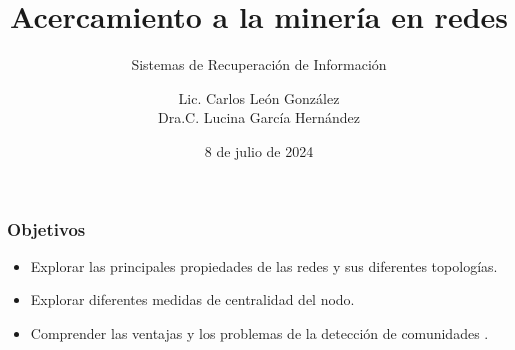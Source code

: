 \documentclass[
10pt, %
aspectratio=169, %
]{beamer}
\title[Short Title]{Acercamiento a la minería en redes}
\subtitle{Sistemas de Recuperación de Información}
\author{Lic. Carlos León González \\ Dra.C. Lucina García Hernández}
\institute[UC]{Facultad de Matem\'atica y Computaci\'on \\ Universidad de La Habana \\ \smallskip }
\date{8 de julio de  2024} %
\begin{document}
	
	
	
	\begin{frame}
		\titlepage
	\end{frame}
	
	\begin{frame}
		
		\frametitle{Objetivos}
		
		\begin{itemize}

			\item Explorar las principales propiedades de las redes y sus diferentes topologías. \\[2mm]
			
			\item Explorar diferentes medidas de centralidad del nodo. \\[2mm]
			
			\item Comprender las ventajas y los problemas de la detección de comunidades .
			
		\end{itemize}
		
	\end{frame}
	
\end{document}
